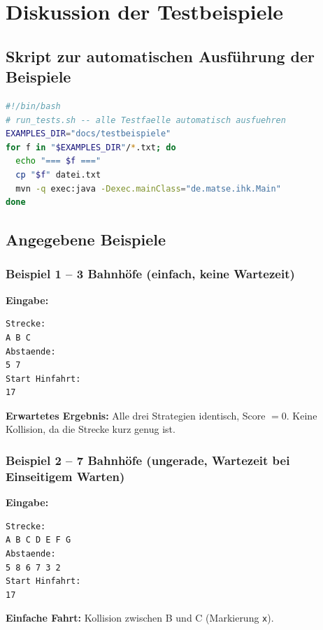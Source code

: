 \documentclass[12pt,a4paper]{article}
\begin{document}
\section{Diskussion der Testbeispiele}

\subsection{Skript zur automatischen Ausführung der Beispiele}

\begin{lstlisting}[language=bash]
#!/bin/bash
# run_tests.sh -- alle Testfaelle automatisch ausfuehren
EXAMPLES_DIR="docs/testbeispiele"
for f in "$EXAMPLES_DIR"/*.txt; do
  echo "=== $f ==="
  cp "$f" datei.txt
  mvn -q exec:java -Dexec.mainClass="de.matse.ihk.Main"
done
\end{lstlisting}

\subsection{Angegebene Beispiele}

\subsubsection{Beispiel 1 -- 3 Bahnhöfe (einfach, keine Wartezeit)}

\textbf{Eingabe:}
\begin{lstlisting}
Strecke:
A B C
Abstaende:
5 7
Start Hinfahrt:
17
\end{lstlisting}

\textbf{Erwartetes Ergebnis:} Alle drei Strategien identisch, Score $= 0$.
Keine Kollision, da die Strecke kurz genug ist.

\subsubsection{Beispiel 2 -- 7 Bahnhöfe (ungerade, Wartezeit bei Einseitigem Warten)}

\textbf{Eingabe:}
\begin{lstlisting}
Strecke:
A B C D E F G
Abstaende:
5 8 6 7 3 2
Start Hinfahrt:
17
\end{lstlisting}

\textbf{Einfache Fahrt:} Kollision zwischen B und C (Markierung \texttt{x}).
\end{document}
